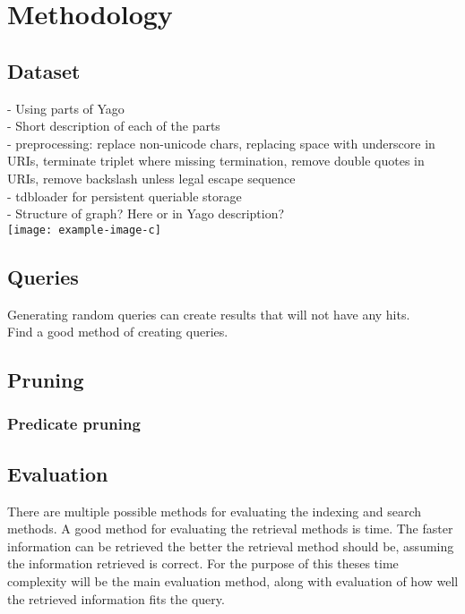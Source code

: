 
\chapter{Methodology}

\section{Dataset}
- Using parts of Yago\\
- Short description of each of the parts\\
- preprocessing: replace non-unicode chars, replacing space with underscore in URIs, terminate triplet where missing termination, remove double quotes in URIs, remove backslash unless legal escape sequence\\
- tdbloader for persistent queriable storage\\
- Structure of graph? Here or in Yago description?\\


\texttt{[image: example-image-c]}

\section{Queries}
Generating random queries can create results that will not have any hits.\\
Find a good method of creating queries.\\

\section{Pruning}
\subsection{Predicate pruning}

\section{Evaluation}
There are multiple possible methods for evaluating the indexing and search methods. A good method for evaluating the retrieval methods is time. The faster information can be retrieved the better the retrieval method should be, assuming the information retrieved is correct. For the purpose of this theses time complexity will be the main evaluation method, along with evaluation of how well the retrieved information fits the query.\\

